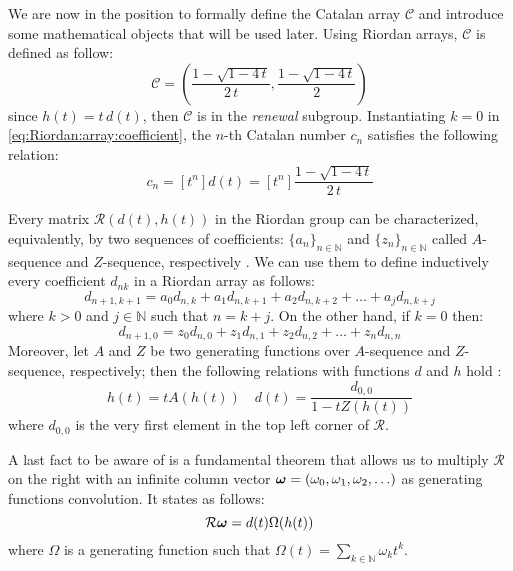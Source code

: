 We are now in the position to formally define the Catalan
array $\mathcal{C}$ and introduce some mathematical objects
that will be used later. Using Riordan arrays, $\mathcal{C}$ 
is defined as follow:
\begin{displaymath}
    \mathcal{C}=\left(\frac{1-\sqrt{1-4\,t}}{2\,t},
        \frac{1-\sqrt{1-4\,t}}{2}\right)
\end{displaymath}
since $h(t)=t\,d(t)$, then $\mathcal{C}$ is in the \emph{renewal} subgroup.
Instantiating $k=0$ in \autoref{eq:Riordan:array:coefficient},
the $n$-th Catalan number $c_{n}$ satisfies the following relation:
\begin{displaymath}
    c_{n} = [t^{n}]d(t)= [t^{n}]\frac{1-\sqrt{1-4\,t}}{2\,t}
\end{displaymath}

Every matrix $\mathcal{R}(d(t), h(t))$ in the Riordan group can be characterized, equivalently,
by two sequences of coefficients: $\lbrace a_{n}\rbrace_{n\in\mathbb{N}}$  and
$\lbrace z_{n}\rbrace_{n\in\mathbb{N}}$ called $A$-sequence and $Z$-sequence, 
respectively \cite{rogers:1977}. We can use them to define inductively every coefficient $d_{nk}$ in a Riordan array
as follows:
\begin{equation}
    d_{n+1, k+1} = a_{0}d_{n,k} + a_{1}d_{n,k+1} + a_{2}d_{n,k+2} + \ldots + a_{j}d_{n,k+j} 
\end{equation}
where $k>0$ and $j\in\mathbb{N}$ such that $n=k+j$. On the other hand, if $k=0$ then:
\begin{equation}
    d_{n+1, 0} = z_{0}d_{n,0} + z_{1}d_{n,1} + z_{2}d_{n,2} + \ldots + z_{n}d_{n,n} 
\end{equation}
Moreover, let $A$ and $Z$ be two generating functions over $A$-sequence and $Z$-sequence, respectively;
then the following relations with functions $d$ and $h$ hold
\cite{merlini:some:alternative:characterizations:1997}:
\begin{equation}
    h(t) = tA(h(t)) \quad d(t)=\frac{d_{0,0}}{1-tZ(h(t))}
\end{equation}
where $d_{0,0}$ is the very first element in the top left corner of $\mathcal{R}$.

A last fact to be aware of is a fundamental theorem that allows us to multiply $\mathcal{R}$ on the right with
an infinite column vector $\boldsymbol{\omega}=(\omega_{0},\omega_{1},\omega_{2},\ldots)$ 
as generating functions convolution. It states as follows:
\begin{equation}
    \mathcal{R}\boldsymbol{\omega} = d(t)\Omega(h(t))    
\end{equation}
where $\Omega$ is a generating function such that $\Omega(t)=\sum_{k\in\mathbb{N}}{\omega_{k}t^{k}}$.

